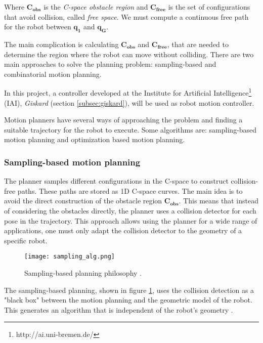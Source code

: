 Where $\bm{C_{obs}}$ is the \textit{C-space obstacle region} and $\bm{C_{free}}$ is the set of configurations that avoid collision, called \textit{free space}. We must compute a continuous free path for the robot between $\bm{q_{1}}$ and $\bm{q_{G}}$.

The main complication is calculating $\bm{C_{obs}}$ and $\bm{C_{free}}$, that are needed to determine the region where the robot can move without colliding. There are two main approaches to solve the planning problem: sampling-based and combinatorial motion planning.

In this project, a controller developed at the Institute for Artificial Intelligence\footnote{http://ai.uni-bremen.de/} (IAI), \textit{Giskard} (section \ref{subsec:giskard}), will be used as robot motion controller.

Motion planners have several ways of approaching the problem and finding a suitable trajectory for the robot to execute. Some algorithms are: sampling-based motion planning and optimization based motion planning.

\subsubsection{Sampling-based motion planning}
\label{subsec:planning}

The planner samples different configurations in the C-space to construct collision-free paths. These paths are stored as 1D C-space curves. The main idea is to avoid the direct construction of the obstacle region $\bm{C_{obs}}$. This means that instead of considering the obstacles directly, the planner uses a collision detector for each pose in the trajectory. This approach allows using the planner for a wide range of applications, one must only adapt the collision detector to the geometry of a specific robot.
\begin{figure}[H]
	\centering
	\texttt{[image: sampling\_alg.png]}
	\vspace{-10pt}
	\caption[Sampling-based planning]{Sampling-based planning philosophy \citep[chap. 5, page 185]{planning}.}
	\vspace{-15pt}
	\label{fig:sampling}
\end{figure}

The sampling-based planning, shown in figure \ref{fig:sampling}, uses the collision detection as a "black box" between the motion planning and the geometric model of the robot. This generates an algorithm that is independent of the robot's geometry \citep{planning} .

